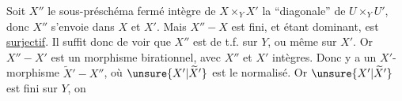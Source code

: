 Soit $X''$ le sous-préschéma fermé intègre de $X\times_YX'$
la ``diagonale'' de $U\times_YU'$, donc $X''$ s'envoie dans $X$ et $X'$.
Mais $X''-X$ est fini, et étant dominant, est \uline{surjectif}.
Il suffit donc de voir que $X''$ est de t.f. sur $Y$, ou même sur $X'$.
Or $X''-X'$ est un morphisme birationnel, avec $X''$ et $X'$ intègres.
Donc  y a un $X'$-morphisme
 $\widetilde X'-X''$, où $\unsure{X'|\widetilde X'}$
est le normalisé. Or $\unsure{X'|\widetilde X'}$ est fini sur $Y$,
on  
